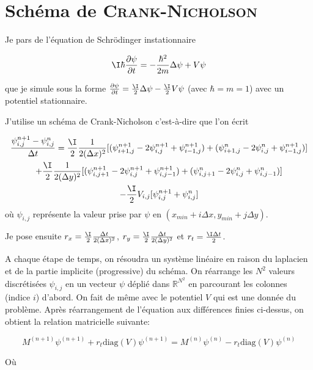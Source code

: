 
\section{Schéma de \textsc{Crank-Nicholson}}
Je pars de l'équation de Schrödinger instationnaire

\begin{equation}
    \I\hbar \frac{\partial\psi}{\partial t} = -\frac{\hbar^2}{2m} \Delta \psi + V\psi
\end{equation}

que je simule sous la forme $\frac{\partial\psi}{\partial t} = \frac{\I}{2} \Delta \psi -\frac{\I}{2} V \psi$ (avec $\hbar = m = 1$) avec un potentiel stationnaire.

J'utilise un schéma de Crank-Nicholson c'est-à-dire que l'on écrit

\begin{multline}
\frac{\psi_{i,j}^{n+1}-\psi_{i,j}^{n}}{\Delta t} = \frac{\I}{2} \frac{1}{2(\Delta x)^2} [(\psi_{i+1,j}^{n+1} -2 \psi_{i,j}^{n+1} + \psi_{i-1,j}^{n+1}) + (\psi_{i+1,j}^{n} -2 \psi_{i,j}^{n}  + \psi_{i-1,j}^{n+1})] \\+ \frac{\I}{2} \frac{1}{2(\Delta y)^2} [(\psi_{i,j+1}^{n+1} -2 \psi_{i,j}^{n+1} + \psi_{i,j-1}^{n+1}) + (\psi_{i,j+1}^{n} -2 \psi_{i,j}^{n} + \psi_{i,j-1}^{n})] \\ - \frac{\I}{2} V_{i,j} [\psi_{i,j}^{n+1} + \psi_{i,j}^{n}]
\end{multline} où $\psi_{i,j}$
 représente la valeur prise par $\psi$ en $(x_{min}+i\Delta x, y_{min}+j\Delta y)$.


Je pose ensuite $r_x = \frac{\I}{2}\frac{\Delta t}{2(\Delta x)^2}$, $r_y = \frac{\I}{2}\frac{\Delta t}{2(\Delta y)^2}$ et $r_t = \frac{\I \Delta t}{2}$.


A chaque étape de temps, on résoudra un système linéaire en raison du laplacien et de la partie implicite (progressive) du schéma. On réarrange les $N^2$ valeurs discrétisées $\psi_{i,j}$ en un vecteur $\psi$ déplié dans $\mathbb{R}^{N^2}$ en parcourant les colonnes (indice $i$) d'abord. On fait de même avec le potentiel $V$ qui est une donnée du problème.
Après réarrangement de l'équation aux différences finies ci-dessus, on obtient la relation matricielle suivante:

\begin{equation}
M^{(n+1)} \psi^{(n+1)} + r_t \text{diag}(V)\psi^{(n+1)} = M^{(n)} \psi^{(n)} -r_t \text{diag}(V) \psi^{(n)}
\end{equation}


Où 

